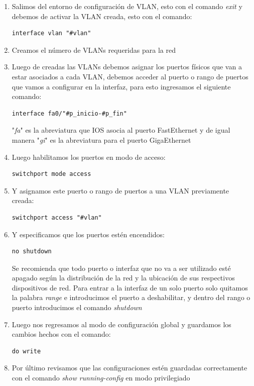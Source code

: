 \documentclass[journal]{IEEEtran}
\begin{document}
\begin{enumerate}
	\item Salimos del entorno de configuración de VLAN, esto con el comando \textit{exit} y debemos de activar la VLAN creada, esto con el comando:
	\begin{lstlisting}[frame=single]
interface vlan "#vlan"
	\end{lstlisting} 
	
	\item Creamos el número de VLANs requeridas para la red
	
	\item Luego de creadas las VLANs debemos asignar los puertos físicos que van a estar asociados a cada VLAN, debemos acceder al puerto o rango de puertos que vamos a configurar en la interfaz, para esto ingresamos el siguiente comando:
	\begin{lstlisting}[frame=single]
interface fa0/"#p_inicio-#p_fin"
	\end{lstlisting}
	"\textit{fa}" es la abreviatura que IOS asocia al puerto FastEthernet y de igual manera "\textit{gi}" es la abreviatura para el puerto GigaEthernet
	
	\item Luego habilitamos los puertos en modo de acceso:
	\begin{lstlisting}[frame=single]
switchport mode access
	\end{lstlisting} 
	
	\item Y asignamos este puerto o rango de puertos a una VLAN previamente creada:
	\begin{lstlisting}[frame=single]
switchport access "#vlan"
	\end{lstlisting}
	
	\item Y especificamos que los puertos estén encendidos:
	\begin{lstlisting}[frame=single]
no shutdown
	\end{lstlisting}
	Se recomienda que todo puerto o interfaz que no va a ser utilizado esté apagado según la distribución de la red y la ubicación de sus respectivos dispositivos de red.
	Para entrar a la interfaz de un solo puerto solo quitamos la palabra \textit{range} e introducimos el puerto a deshabilitar, y dentro del rango o puerto introducimos el comando \textit{shutdown}
	
	\item Luego nos regresamos al modo de configuración global y guardamos los cambios hechos con el comando:
	\begin{lstlisting}[frame=single]
do write
	\end{lstlisting}
	
	 \item Por último revisamos que las configuraciones estén guardadas correctamente con el comando \textit{show running-config} en modo privilegiado 
	 
\end{enumerate}
\end{document}
